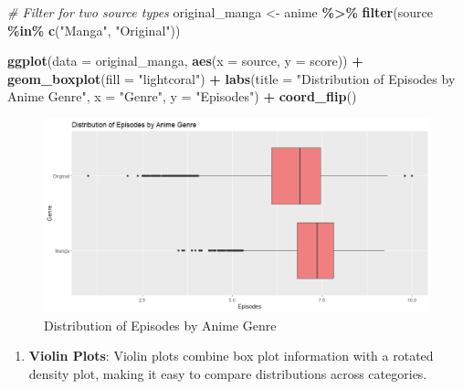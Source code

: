 \documentclass[
]{book}
\newenvironment{Shaded}{\begin{snugshade}}{\end{snugshade}}
\newcommand{\AttributeTok}[1]{\textcolor[rgb]{0.13,0.29,0.53}{#1}}
\newcommand{\CommentTok}[1]{\textcolor[rgb]{0.56,0.35,0.01}{\textit{#1}}}
\newcommand{\FunctionTok}[1]{\textcolor[rgb]{0.13,0.29,0.53}{\textbf{#1}}}
\newcommand{\NormalTok}[1]{#1}
\newcommand{\OtherTok}[1]{\textcolor[rgb]{0.56,0.35,0.01}{#1}}
\newcommand{\SpecialCharTok}[1]{\textcolor[rgb]{0.81,0.36,0.00}{\textbf{#1}}}
\newcommand{\StringTok}[1]{\textcolor[rgb]{0.31,0.60,0.02}{#1}}
\providecommand{\tightlist}{%
  \setlength{\itemsep}{0pt}\setlength{\parskip}{0pt}}
\begin{document}
\begin{Shaded}
\begin{Highlighting}[]
\CommentTok{\# Filter for two source types}
\NormalTok{original\_manga }\OtherTok{\textless{}{-}}\NormalTok{ anime }\SpecialCharTok{\%\textgreater{}\%}
  \FunctionTok{filter}\NormalTok{(source }\SpecialCharTok{\%in\%} \FunctionTok{c}\NormalTok{(}\StringTok{"Manga"}\NormalTok{, }\StringTok{"Original"}\NormalTok{))}

\FunctionTok{ggplot}\NormalTok{(}\AttributeTok{data =}\NormalTok{ original\_manga, }\FunctionTok{aes}\NormalTok{(}\AttributeTok{x =}\NormalTok{ source, }\AttributeTok{y =}\NormalTok{ score)) }\SpecialCharTok{+}
  \FunctionTok{geom\_boxplot}\NormalTok{(}\AttributeTok{fill =} \StringTok{"lightcoral"}\NormalTok{) }\SpecialCharTok{+}
  \FunctionTok{labs}\NormalTok{(}\AttributeTok{title =} \StringTok{"Distribution of Episodes by Anime Genre"}\NormalTok{, }\AttributeTok{x =} \StringTok{"Genre"}\NormalTok{, }\AttributeTok{y =} \StringTok{"Episodes"}\NormalTok{) }\SpecialCharTok{+}
  \FunctionTok{coord\_flip}\NormalTok{()}
\end{Highlighting}
\end{Shaded}

\begin{figure}
\centering
\includegraphics[width=1\textwidth,height=\textheight]{images/box_plotsv2.png}
\caption{Distribution of Episodes by Anime Genre}
\end{figure}

\begin{enumerate}
\def\labelenumi{\arabic{enumi}.}
\setcounter{enumi}{2}
\tightlist
\item
  \textbf{Violin Plots}: Violin plots combine box plot information with a rotated density plot, making it easy to compare distributions across categories.
\end{enumerate}
\end{document}
